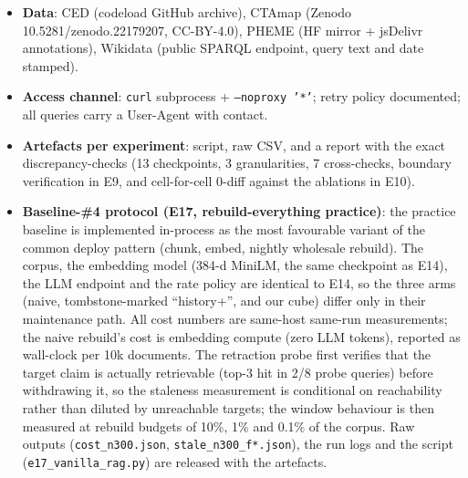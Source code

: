 \begin{itemize}
\item \textbf{Data}: CED (codeload GitHub archive), CTAmap (Zenodo 10.5281/zenodo.22179207, CC-BY-4.0), PHEME (HF mirror + jsDelivr annotations), Wikidata (public SPARQL endpoint, query text and date stamped).
\item \textbf{Access channel}: \texttt{curl} subprocess + \texttt{--noproxy '*'}; retry policy documented; all queries carry a User-Agent with contact.
\item \textbf{Artefacts per experiment}: script, raw CSV, and a report with the exact discrepancy-checks (13 checkpoints, 3 granularities, 7 cross-checks, boundary verification in E9, and cell-for-cell 0-diff against the ablations in E10).
\item \textbf{Baseline-\#4 protocol (E17, rebuild-everything practice)}: the practice baseline is implemented in-process as the most favourable variant of the common deploy pattern (chunk, embed, nightly wholesale rebuild). The corpus, the embedding model (384-d MiniLM, the same checkpoint as E14), the LLM endpoint and the rate policy are identical to E14, so the three arms (naive, tombstone-marked ``history+'', and our cube) differ only in their maintenance path. All cost numbers are same-host same-run measurements; the naive rebuild's cost is embedding compute (zero LLM tokens), reported as wall-clock per 10k documents. The retraction probe first verifies that the target claim is actually retrievable (top-3 hit in 2/8 probe queries) before withdrawing it, so the staleness measurement is conditional on reachability rather than diluted by unreachable targets; the window behaviour is then measured at rebuild budgets of 10\%, 1\% and 0.1\% of the corpus. Raw outputs (\texttt{cost\_n300.json}, \texttt{stale\_n300\_f*.json}), the run logs and the script (\texttt{e17\_vanilla\_rag.py}) are released with the artefacts.

\end{itemize}
